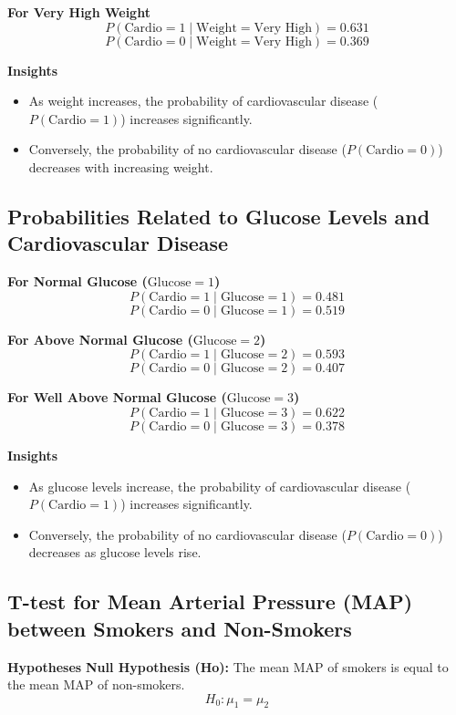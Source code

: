 \documentclass[12pt]{article}
\begin{document}
\textbf{For Very High Weight}
\[
P(\text{Cardio} = 1 \mid \text{Weight} = \text{Very High}) = 0.631
\]
\[
P(\text{Cardio} = 0 \mid \text{Weight} = \text{Very High}) = 0.369
\]

\textbf{Insights}
\begin{itemize}
    \item As weight increases, the probability of cardiovascular disease (\( P(\text{Cardio} = 1) \)) increases significantly.
    \item Conversely, the probability of no cardiovascular disease (\( P(\text{Cardio} = 0) \)) decreases with increasing weight.
\end{itemize}


\subsection{Probabilities Related to Glucose Levels and Cardiovascular Disease}

\textbf{For Normal Glucose (\( \text{Glucose} = 1 \))}
\[
P(\text{Cardio} = 1 \mid \text{Glucose} = 1) = 0.481
\]
\[
P(\text{Cardio} = 0 \mid \text{Glucose} = 1) = 0.519
\]

\textbf{For Above Normal Glucose (\( \text{Glucose} = 2 \))}
\[
P(\text{Cardio} = 1 \mid \text{Glucose} = 2) = 0.593
\]
\[
P(\text{Cardio} = 0 \mid \text{Glucose} = 2) = 0.407
\]

\textbf{For Well Above Normal Glucose (\( \text{Glucose} = 3 \))}
\[
P(\text{Cardio} = 1 \mid \text{Glucose} = 3) = 0.622
\]
\[
P(\text{Cardio} = 0 \mid \text{Glucose} = 3) = 0.378
\]

\textbf{Insights}
\begin{itemize}
    \item As glucose levels increase, the probability of cardiovascular disease (\( P(\text{Cardio} = 1) \)) increases significantly.
    \item Conversely, the probability of no cardiovascular disease (\( P(\text{Cardio} = 0) \)) decreases as glucose levels rise.
\end{itemize}

\subsection{T-test for Mean Arterial Pressure (MAP) between Smokers and Non-Smokers}

\textbf{Hypotheses}
\textbf{Null Hypothesis (Ho):} The mean MAP of smokers is equal to the mean MAP of non-smokers.  
\[
H_0: \mu_1 = \mu_2
\]
\end{document}
